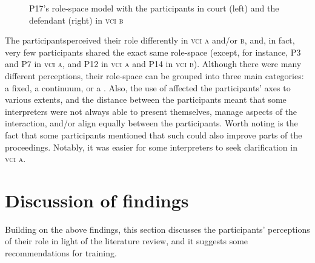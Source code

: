 \documentclass[output=paper]{langsci/langscibook}
\begin{document}
\begin{figure}
   
\caption{\label{fig:devaux:9}P17's role-space model with the participants in court (left) and the defendant (right) in \textsc{vci b}}
\end{figure}

The participants\largerpage perceived their role differently in \textsc{vci a} and/or \textsc{b}, and, in fact, very few participants shared the exact same role-space (except, for instance, P3 and P7 in \textsc{vci a}, and P12 in \textsc{vci a} and P14 in \textsc{vci b}). Although there were many different perceptions, their role-space can be grouped into three main categories: a fixed, a continuum, or a . Also, the use of  affected the participants’ axes to various extents, and the distance between the participants meant that some interpreters were not always able to present themselves, manage aspects of the interaction, and/or align equally between the  participants. Worth noting is the fact that some participants mentioned that such  could also improve parts of the  proceedings. Notably, it was easier for some interpreters to seek clarification in \textsc{vci a}. 

\section{Discussion of findings}
\label{sec:devaux:6}
Building on the above findings, this section discusses the participants’ perceptions of their role in light of the literature review, and it suggests some recommendations for training.
\end{document}
